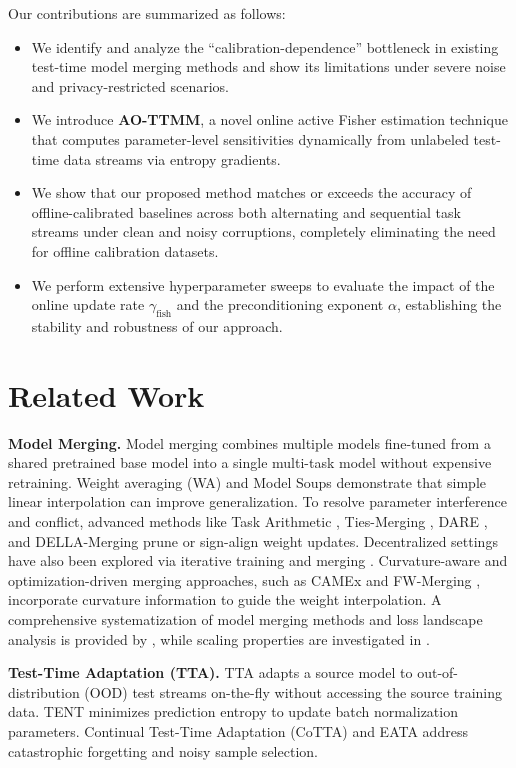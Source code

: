 \documentclass{article}
\theoremstyle{plain}
\theoremstyle{definition}
\begin{document}
Our contributions are summarized as follows:
\begin{itemize}
    \item We identify and analyze the ``calibration-dependence'' bottleneck in existing test-time model merging methods and show its limitations under severe noise and privacy-restricted scenarios.
    \item We introduce \textbf{AO-TTMM}, a novel online active Fisher estimation technique that computes parameter-level sensitivities dynamically from unlabeled test-time data streams via entropy gradients.
    \item We show that our proposed method matches or exceeds the accuracy of offline-calibrated baselines across both alternating and sequential task streams under clean and noisy corruptions, completely eliminating the need for offline calibration datasets.
    \item We perform extensive hyperparameter sweeps to evaluate the impact of the online update rate $\gamma_{\text{fish}}$ and the preconditioning exponent $\alpha$, establishing the stability and robustness of our approach.
\end{itemize}

\section{Related Work}
\label{submission-related-work}

\textbf{Model Merging.} Model merging combines multiple models fine-tuned from a shared pretrained base model into a single multi-task model without expensive retraining. Weight averaging (WA) and Model Soups \cite{modelsoups} demonstrate that simple linear interpolation can improve generalization. To resolve parameter interference and conflict, advanced methods like Task Arithmetic \cite{taskarithmetic}, Ties-Merging \cite{tiesmerging}, DARE \cite{dare}, and DELLA-Merging \cite{pala2024_37} prune or sign-align weight updates. Decentralized settings have also been explored via iterative training and merging \cite{saadati2024_20}. Curvature-aware and optimization-driven merging approaches, such as CAMEx \cite{dung2025_92} and FW-Merging \cite{chen2025_77}, incorporate curvature information to guide the weight interpolation. A comprehensive systematization of model merging methods and loss landscape analysis is provided by \citet{khan2024_22}, while scaling properties are investigated in \citet{yadav2024_38}.

\textbf{Test-Time Adaptation (TTA).} TTA adapts a source model to out-of-distribution (OOD) test streams on-the-fly without accessing the source training data. TENT \cite{tent} minimizes prediction entropy to update batch normalization parameters. Continual Test-Time Adaptation (CoTTA) \cite{cotta} and EATA \cite{eata} address catastrophic forgetting and noisy sample selection. 
\end{document}
